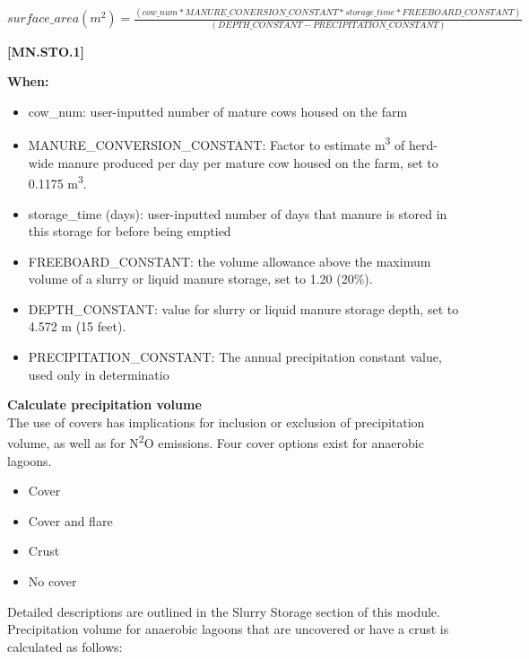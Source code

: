 \begin{refsection}
    \begin{center}
        \(surface\_area (m^2) = \frac{(cow\_num * MANURE\_CONERSION\_CONSTANT * storage\_time * FREEBOARD\_CONSTANT) }{ (DEPTH\_CONSTANT - PRECIPITATION\_CONSTANT)}\)
    \end{center}
        \vspace{0.5cm} 
    
            {\raggedleft \textbf{[MN.STO.1]}\par}
            \vspace{0.5cm}

    \textbf{When:}
    
    \begin{itemize}
        \item cow\_num: user-inputted number of mature cows housed on the farm
        \item MANURE\_CONVERSION\_CONSTANT: Factor to estimate  m\textsuperscript{3} of herd-wide manure produced per day per mature cow housed on the farm, set to 0.1175  m\textsuperscript{3}.
        \item storage\_time (days): user-inputted number of days that manure is stored in this storage for before being emptied
        \item FREEBOARD\_CONSTANT: the volume allowance above the maximum volume of a slurry or liquid manure storage, set to 1.20 (20\%).
        \item DEPTH\_CONSTANT: value for slurry or liquid manure storage depth, set to 4.572 m (15 feet). 
        \item PRECIPITATION\_CONSTANT: The annual precipitation constant value, used only in determinatio

    \end{itemize}
    \vspace{0.2cm}
    
\textbf{Calculate precipitation volume}\\
The use of covers has implications for inclusion or exclusion of precipitation volume, as well as for N\textsuperscript{2}O emissions. Four cover options exist for anaerobic lagoons. 
    \begin{itemize}
        \item Cover
        \item Cover and flare
        \item Crust
        \item No cover
    \end{itemize}

Detailed descriptions are outlined in the Slurry Storage section of this module. Precipitation volume for anaerobic lagoons that are uncovered or have a crust is calculated as follows:\\
        \vspace{0.5cm}


\end{refsection}

